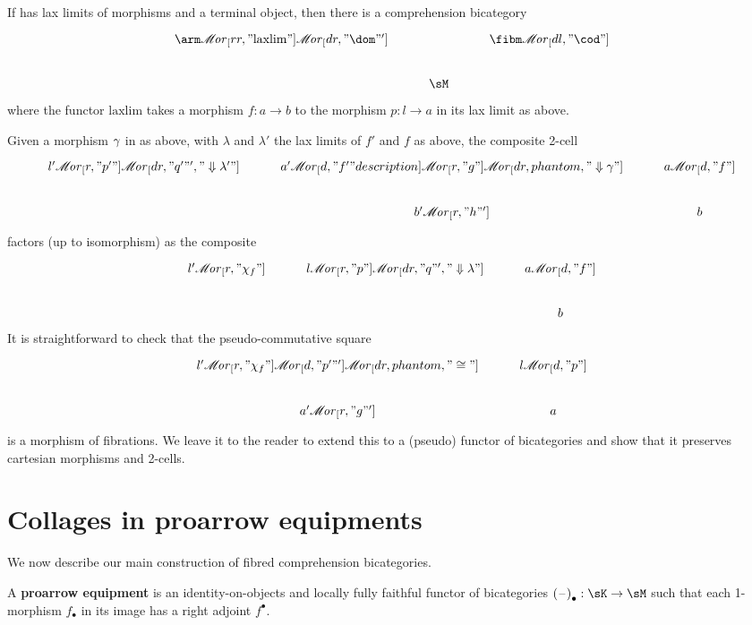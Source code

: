 \documentclass{amsart}
\def\ar#1{\mathscr{M}\!\mathit{or}_{#1}}
\def\rep#1{{#1}_\bullet}
\def\corep#1{{#1}^\bullet}
\begin{document}
\begin{prob}\label{thm:arm-ccbicat}
  If \sM has lax limits of morphisms and a terminal object, then there is a comprehension bicategory
  \[
  \begin{tikzcd}
    \arm \ar[rr,"\mathrm{laxlim}"] \ar[dr,"\dom"'] && \fibm \ar[dl,"\cod"] \\
    &\sM
  \end{tikzcd}
  \]
  where the functor $\mathrm{laxlim}$ takes a morphism $f:a\to b$ to the morphism $p:l\to a$ in its lax limit as above.
\end{prob}
\begin{constr}
  Given a morphism $\gamma$ in \arm as above, with $\lambda$ and $\lambda'$ the lax limits of $f'$ and $f$ as above, the composite 2-cell
  \[
  \begin{tikzcd}
    l' \ar[r,"p'"]\ar[dr,"q'"',"\Downarrow\lambda'"] &
    a' \ar[d,"f'" description] \ar[r,"g"] \ar[dr,phantom,"\Downarrow \gm"] & a \ar[d,"f"] \\
    & b' \ar[r,"h"'] & b
  \end{tikzcd}
  \]
  factors (up to isomorphism) as the composite
  \[
  \begin{tikzcd}
    l' \ar[r,"\chi_f"] & l \ar[r,"p"] \ar[dr,"q"',"\Downarrow\lambda"] & a \ar[d,"f"] \\ && b
  \end{tikzcd}
  \]
  It is straightforward to check that the pseudo-commutative square
  \[
  \begin{tikzcd}
    l' \ar[r,"\chi_f"] \ar[d,"p'"'] \ar[dr,phantom,"\cong"] & l \ar[d,"p"] \\ a' \ar[r,"g"'] & a
  \end{tikzcd}
  \]
  is a morphism of fibrations.
  We leave it to the reader to extend this to a (pseudo) functor of bicategories and show that it preserves cartesian morphisms and 2-cells.
\end{constr}


\section{Collages in proarrow equipments}
\label{sec:equip}

We now describe our main construction of fibred comprehension bicategories.

\begin{defn}
  A \textbf{proarrow equipment} is an identity-on-objects and locally fully faithful functor of bicategories $\rep{(\blank)} : \sK\to\sM$ such that each 1-morphism $\rep f$ in its image has a right adjoint $\corep f$.
\end{defn}
\end{document}
